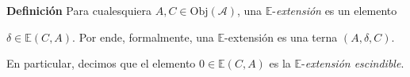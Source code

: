\documentclass[preview]{standalone}
\begin{document}
\begin{center}
\textbf{Definición} Para cualesquiera $A,C\in\text{Obj}(\mathscr{A})$, una $\mathbb{E}$-\emph{extensión} es un elemento \begin{flushleft} $\delta\in\mathbb{E}(C,A)$. Por ende, formalmente, una $\mathbb{E}$-extensión es una terna $(A,\delta,C)$. \end{flushleft} En particular, decimos que el elemento $0\in\mathbb{E}(C,A)$ es la $\mathbb{E}$-\emph{extensión escindible}.
\end{center}
\end{document}
